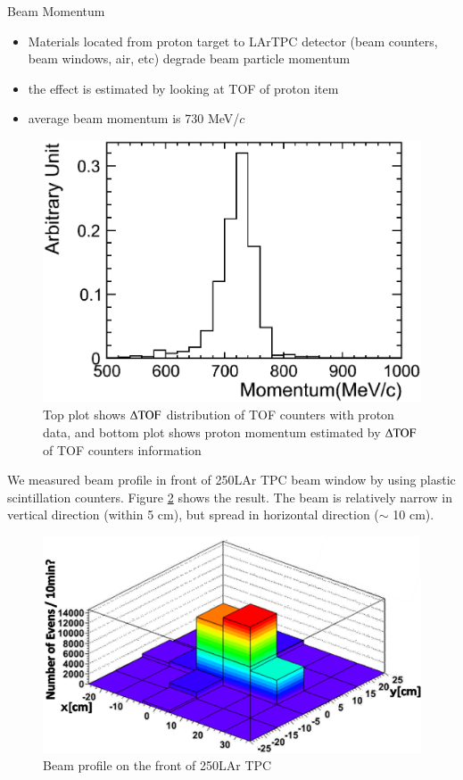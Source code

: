Beam Momentum
\begin{itemize}
\item Materials located from proton target to LArTPC detector (beam counters, beam windows, air, etc) degrade beam particle momentum
\item the effect is estimated by looking at TOF of proton item
\item average beam momentum is 730 MeV/$c$
\end{itemize}

\begin{figure}[htbp]
  \begin{center}
    \includegraphics[width=1.0\hsize,clip]{fig/Momentum_proton.eps}
    \caption{Top plot shows $\rm {\Delta TOF}$ distribution of TOF counters with proton data,
      and bottom plot shows proton momentum estimated by $\rm {\Delta TOF}$ of TOF counters information}
    \label{fig:Proton_momentum}
  \end{center}
\end{figure} 

We measured beam profile in front of 250LAr TPC beam window by using plastic scintillation counters.
Figure \ref{beamprofile_250L} shows the result.
The beam is relatively narrow in vertical direction (within 5 cm),
but spread in horizontal direction ($\sim$ 10 cm).

\begin{figure}[!htb]
  \begin{center}
     \includegraphics[width=0.8\hsize,clip]{./fig/BeamProfile3.eps}
  \end{center}
  \caption{Beam profile on the front of 250LAr TPC}
  \label{beamprofile_250L}
\end{figure}


